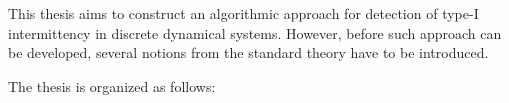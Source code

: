 



\bigskip

This thesis aims to construct an algorithmic approach for detection of type-I intermittency in discrete dynamical systems.
However, before such approach can be developed, several notions from the standard theory have to be introduced.
\par
The thesis is organized as follows:

